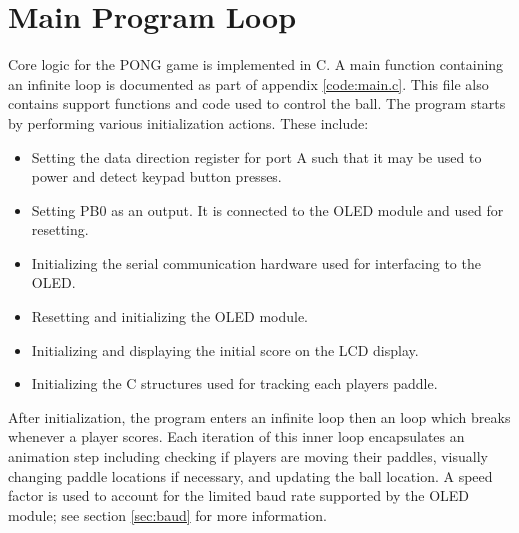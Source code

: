 \section{Main Program Loop} 
\label{sec:main}

Core logic for the PONG game is implemented in C.
A main function containing an infinite loop is documented as part of appendix \ref{code:main.c}.
This file also contains support functions and code used to control the ball.
The program starts by performing various initialization actions. These include:

\begin{itemize}
\item Setting the data direction register for port A such that it may be used to power and detect keypad button presses.
\item Setting PB0 as an output. It is connected to the OLED module and used for resetting.
\item Initializing the serial communication hardware used for interfacing to the OLED.
\item Resetting and initializing the OLED module.
\item Initializing and displaying the initial score on the LCD display.
\item Initializing the C structures used for tracking each players paddle.
\end{itemize}

After initialization, the program enters an  infinite loop then an  loop which breaks whenever a player scores.
Each iteration of this inner loop encapsulates an animation step including checking if players are moving their paddles, visually changing paddle locations if necessary, and updating the ball location.
A speed factor is used to account for the limited baud rate supported by the OLED module; see section \ref{sec:baud} for more information.